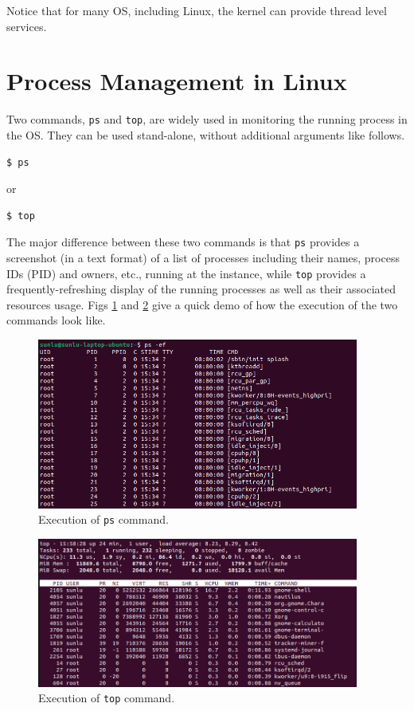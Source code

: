 Notice that for many OS, including Linux, the kernel can provide thread level services.

\section{Process Management in Linux}

Two commands, \verb|ps| and \verb|top|, are widely used in monitoring the running process in the OS. They can be used stand-alone, without additional arguments like follows.
\begin{lstlisting}
$ ps
\end{lstlisting}
or
\begin{lstlisting}
$ top
\end{lstlisting}

The major difference between these two commands is that \verb|ps| provides a screenshot (in a text format) of a list of processes including their names, process IDs (PID) and owners, etc., running at the instance, while \verb|top| provides a frequently-refreshing display of the running processes as well as their associated resources usage. Figs \ref{ch:pm:fig:pscommand} and \ref{ch:pm:fig:topcommand} give a quick demo of how the execution of the two commands look like.

\begin{figure}[htbp]
	\centering
	\includegraphics[width=300pt]{chapters/part-1/figures/pscommand.png}
	\caption{Execution of \texttt{ps} command.} \label{ch:pm:fig:pscommand}
\end{figure}

\begin{figure}[htbp]
	\centering
	\includegraphics[width=300pt]{chapters/part-1/figures/topcommand.png}
	\caption{Execution of \texttt{top} command.} \label{ch:pm:fig:topcommand}
\end{figure}

